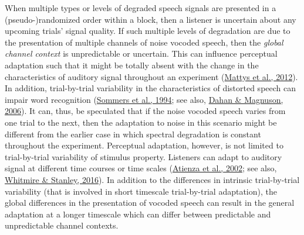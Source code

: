 \documentclass[a4paper, nobind]{templates/ociamthesis}
\begin{document}
When multiple types or levels of degraded speech signals are presented in a (pseudo-)randomized order within a block, then a listener is uncertain about any upcoming trials' signal quality.
If such multiple levels of degradation are due to the presentation of multiple channels of noise vocoded speech, then the \emph{global channel context} is unpredictable or uncertain.
This can influence perceptual adaptation such that
it might be totally absent with the change in the characteristics of auditory signal throughout an experiment (\protect\hyperlink{ref-Mattys2012}{Mattys et al., 2012}).
In addition, trial-by-trial variability in the characteristics of distorted speech can impair word recognition (\protect\hyperlink{ref-Sommers1994}{Sommers et al., 1994}; see also, \protect\hyperlink{ref-Dahan2006}{Dahan \& Magnuson, 2006}).
It can, thus, be speculated that if the noise vocoded speech varies from one trial to the next, then the adaptation to noise in this scenario might be different from the earlier case in which spectral degradation is constant throughout the experiment.
Perceptual adaptation, however, is not limited to trial-by-trial variability of stimulus property.
Listeners can adapt to auditory signal at different time courses or time scales (\protect\hyperlink{ref-Atienza2002}{Atienza et al., 2002}; see also, \protect\hyperlink{ref-Whitmire2016}{Whitmire \& Stanley, 2016}).
In addition to the differences in intrinsic trial-by-trial variability (that is involved in short timescale trial-by-trial adaptation),
the global differences in the presentation of vocoded speech can result in the general adaptation at a longer timescale
which can differ between predictable and unpredictable channel contexts.
\end{document}
